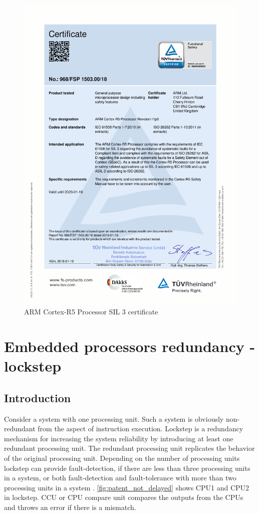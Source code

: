 \begin{figure}[H]

      \centering
      \includegraphics[width=0.9\linewidth]{images/cortex_r_certificate.pdf}
      \caption{ARM Cortex-R5 Processor  SIL 3 certificate}
      \label{fig:func_safety_certificate}
    
\end{figure}

\section{Embedded processors redundancy - lockstep}

\subsection{Introduction}

Consider a system with one processing unit. Such a system is obviously non-redundant from the
aspect of instruction execution. Lockstep is a redundancy mechanism for increasing the system reliability
by introducing at least one redundant processing unit. The redundant processing unit replicates the behavior of
the original processing unit. Depending on the number of processing units lockstep can provide fault-detection, if there are less than three processing units in a system, or both fault-detection and
fault-tolerance with more than two processing units in a system \citep{ipavic_lockstep}. \autoref{fig:patent_not_delayed} shows CPU1 and CPU2 in lockstep. CCU or CPU compare unit compares the outputs from the CPUs and throws an error if there is a mismatch.

